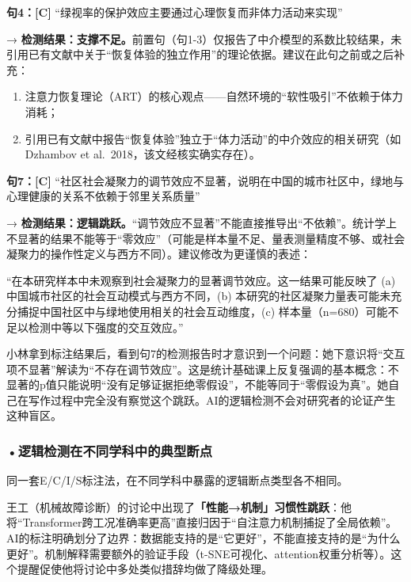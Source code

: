\begin{aibox}
\textbf{句4：[C]} ``绿视率的保护效应主要通过心理恢复而非体力活动来实现''

→ \textbf{检测结果：支撑不足。}前置句（句1-3）仅报告了中介模型的系数比较结果，未引用已有文献中关于``恢复体验的独立作用''的理论依据。建议在此句之前或之后补充：
\begin{enumerate}[nosep,label=(\alph*)]
\item 注意力恢复理论（ART）的核心观点——自然环境的``软性吸引''不依赖于体力消耗；
\item 引用已有文献中报告``恢复体验''独立于``体力活动''的中介效应的相关研究（如Dzhambov et al.\ 2018，该文经核实确实存在）。
\end{enumerate}

\smallskip
\textbf{句7：[C]} ``社区社会凝聚力的调节效应不显著，说明在中国的城市社区中，绿地与心理健康的关系不依赖于邻里关系质量''

→ \textbf{检测结果：逻辑跳跃。}``调节效应不显著''不能直接推导出``不依赖''。统计学上不显著的结果不能等于``零效应''（可能是样本量不足、量表测量精度不够、或社会凝聚力的操作性定义与西方不同）。建议修改为更谨慎的表述：

``在本研究样本中未观察到社会凝聚力的显著调节效应。这一结果可能反映了 (a) 中国城市社区的社会互动模式与西方不同，(b) 本研究的社区凝聚力量表可能未充分捕捉中国社区中与绿地使用相关的社会互动维度，(c) 样本量（n=680）可能不足以检测中等以下强度的交互效应。''
\end{aibox}

\begin{critiquebox}
小林拿到标注结果后，看到句7的检测报告时才意识到一个问题：她下意识将``交互项不显著''解读为``不存在调节效应''。这是统计基础课上反复强调的基本概念：不显著的p值只能说明``没有足够证据拒绝零假设''，不能等同于``零假设为真''。她自己在写作过程中完全没有察觉这个跳跃。AI的逻辑检测不会对研究者的论证产生这种盲区。
\end{critiquebox}

\medskip
\subsubsection*{\textbf{•逻辑检测在不同学科中的典型断点}}同一套E/C/I/S标注法，在不同学科中暴露的逻辑断点类型各不相同。

王工（机械故障诊断）的讨论中出现了\textbf{「性能→机制」习惯性跳跃}：他将``Transformer跨工况准确率更高''直接归因于``自注意力机制捕捉了全局依赖''。AI的标注明确划分了边界：数据能支持的是``它更好''，不能直接支持的是``为什么更好''。机制解释需要额外的验证手段（t-SNE可视化、attention权重分析等）。这个提醒促使他将讨论中多处类似措辞均做了降级处理。

